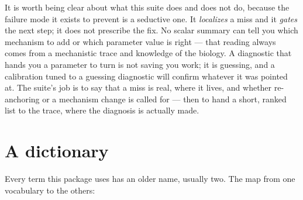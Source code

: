 \documentclass[11pt]{article}
\begin{document}
It is worth being clear about what this suite does and does not do, because the failure
mode it exists to prevent is a seductive one. It \emph{localizes} a miss and it
\emph{gates} the next step; it does not prescribe the fix. No scalar summary can tell you
which mechanism to add or which parameter value is right --- that reading always comes from
a mechanistic trace and knowledge of the biology. A diagnostic that hands you a parameter
to turn is not saving you work; it is guessing, and a calibration tuned to a guessing
diagnostic will confirm whatever it was pointed at. The suite's job is to say that a miss
is real, where it lives, and whether re-anchoring or a mechanism change is called for ---
then to hand a short, ranked list to the trace, where the diagnosis is actually made.

\section{A dictionary}

Every term this package uses has an older name, usually two. The map from one vocabulary
to the others:
\end{document}

